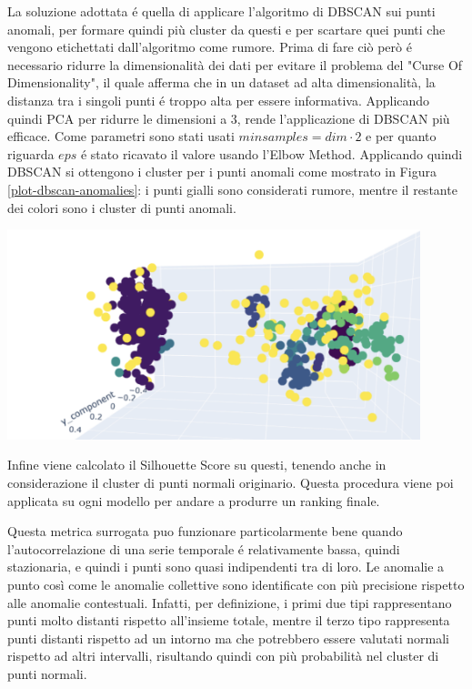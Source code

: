 La soluzione adottata é quella di applicare l'algoritmo di DBSCAN sui punti anomali, per formare quindi più cluster da questi e per scartare quei punti che vengono etichettati dall'algoritmo come rumore.
Prima di fare ciò però é necessario ridurre la dimensionalità dei dati per evitare il problema del "Curse Of Dimensionality", il quale afferma che in un dataset ad alta dimensionalità, la distanza tra i singoli punti é troppo alta per essere informativa.
Applicando quindi PCA per ridurre le dimensioni a 3, rende l'applicazione di DBSCAN più efficace. Come parametri sono stati usati $minsamples=dim \cdot 2$ e per quanto riguarda $eps$ é stato ricavato il valore usando l'Elbow Method.
Applicando quindi DBSCAN si ottengono i cluster per i punti anomali come mostrato in Figura \ref{plot-dbscan-anomalies}: i punti gialli sono considerati rumore, mentre il restante dei colori sono i cluster di punti anomali.

\begin{center}
	\includegraphics[width=12cm, scale=1]{images/plot-dbscan-anomalies}
    \captionsetup{type=figure}
    \label{plot-dbscan-anomalies}
\end{center}

Infine viene calcolato il Silhouette Score su questi, tenendo anche in considerazione il cluster di punti normali originario. Questa procedura viene poi applicata su ogni modello per andare a produrre un ranking finale.

Questa metrica surrogata puo funzionare particolarmente bene quando l'autocorrelazione di una serie temporale é relativamente bassa, quindi stazionaria, e quindi i punti sono quasi indipendenti tra di loro. Le anomalie a punto così come le anomalie collettive sono identificate con più precisione rispetto alle anomalie contestuali. Infatti, per definizione, i primi due tipi rappresentano punti molto distanti rispetto all'insieme totale, mentre il terzo tipo rappresenta punti distanti rispetto ad un intorno ma che potrebbero essere valutati normali rispetto ad altri intervalli, risultando quindi con più probabilità nel cluster di punti normali.
